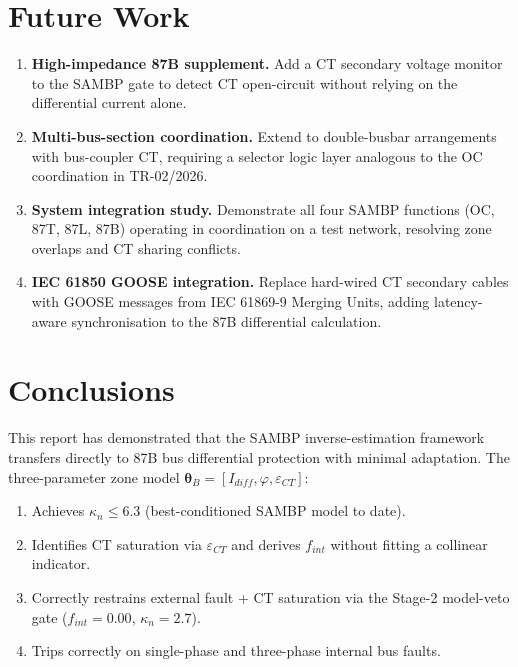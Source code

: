 \documentclass[12pt,a4paper]{article}
\newcommand{\kappan}{\kappa_n}
\newcommand{\thetaB}{\boldsymbol{\theta}_B}
\begin{document}
\section{Future Work}
\label{sec:future}

\begin{enumerate}
  \item \textbf{High-impedance 87B supplement.}  Add a CT secondary voltage
    monitor to the SAMBP gate to detect CT open-circuit without relying on the
    differential current alone.
  \item \textbf{Multi-bus-section coordination.}  Extend to double-busbar
    arrangements with bus-coupler CT, requiring a selector logic layer
    analogous to the OC coordination in TR-02/2026.
  \item \textbf{System integration study.}  Demonstrate all four SAMBP
    functions (OC, 87T, 87L, 87B) operating in coordination on a test
    network, resolving zone overlaps and CT sharing conflicts.
  \item \textbf{IEC 61850 GOOSE integration.}  Replace hard-wired CT secondary
    cables with GOOSE messages from IEC 61869-9 Merging Units, adding
    latency-aware synchronisation to the 87B differential calculation.
\end{enumerate}

\section{Conclusions}
\label{sec:conclusions}

This report has demonstrated that the SAMBP inverse-estimation framework
transfers directly to 87B bus differential protection with minimal adaptation.
The three-parameter zone model $\thetaB = [I_{diff}, \varphi, \varepsilon_{CT}]$:

\begin{enumerate}
  \item Achieves $\kappan \leq 6.3$ (best-conditioned SAMBP model to date).
  \item Identifies CT saturation via $\varepsilon_{CT}$ and derives $f_{int}$
    without fitting a collinear indicator.
  \item Correctly restrains external fault + CT saturation via the Stage-2
    model-veto gate ($f_{int}=0.00$, $\kappan=2.7$).
  \item Trips correctly on single-phase and three-phase internal bus faults.
\end{enumerate}
\end{document}
